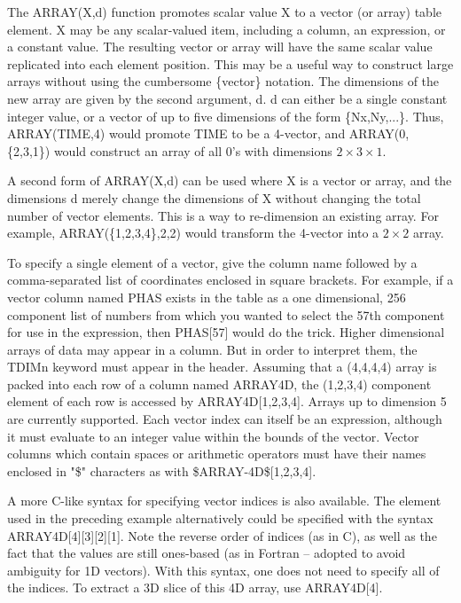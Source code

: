 \documentclass[11pt]{book}
\begin{document}
    The ARRAY(X,d) function promotes scalar value X to a vector (or
    array) table element.  X may be any scalar-valued item, including
    a column, an expression, or a constant value.  The resulting
    vector or array will have the same scalar value replicated into
    each element position.  This may be a useful way to construct
    large arrays without using the cumbersome \{vector\} notation. The
    dimensions of the new array are given by the second argument, d.
    d can either be a single constant integer value, or a vector of up
    to five dimensions of the form \{Nx,Ny,...\}.  Thus, ARRAY(TIME,4)
    would promote TIME to be a 4-vector, and ARRAY(0, \{2,3,1\}) would
    construct an array of all 0's with dimensions $2\times 3\times 1$.

    A second form of ARRAY(X,d) can be used where X is a vector or
    array, and the dimensions d merely change the dimensions of X
    without changing the total number of vector elements.  This is a
    way to re-dimension an existing array.  For example,
    ARRAY(\{1,2,3,4\},{2,2}) would transform the 4-vector into a
    $2\times 2$ array.

    To  specify  a  single  element  of  a  vector, give the column name
    followed by  a  comma-separated  list  of  coordinates  enclosed  in
    square  brackets.  For example, if a vector column named PHAS exists
    in the table as a one dimensional, 256  component  list  of  numbers
    from  which  you  wanted to select the 57th component for use in the
    expression, then PHAS[57] would do the  trick.   Higher  dimensional
    arrays  of  data  may appear in a column.  But in order to interpret
    them, the TDIMn keyword must appear in the header.  Assuming that  a
    (4,4,4,4)  array  is packed into each row of a column named ARRAY4D,
    the  (1,2,3,4)  component  element  of  each  row  is  accessed   by
    ARRAY4D[1,2,3,4].    Arrays   up   to   dimension  5  are  currently
    supported.  Each vector index can itself be an expression,  although
    it  must  evaluate  to  an  integer  value  within the bounds of the
    vector.  Vector columns which contain spaces or arithmetic operators
    must   have   their   names  enclosed  in  "\$"  characters  as  with
    \$ARRAY-4D\$[1,2,3,4].

    A  more  C-like  syntax  for  specifying  vector  indices  is   also
    available.   The element used in the preceding example alternatively
    could be specified with the syntax  ARRAY4D[4][3][2][1].   Note  the
    reverse  order  of  indices  (as in C), as well as the fact that the
    values are still ones-based (as  in  Fortran  --  adopted  to  avoid
    ambiguity  for  1D vectors).  With this syntax, one does not need to
    specify all of the indices.  To  extract  a  3D  slice  of  this  4D
    array, use ARRAY4D[4].
\end{document}
